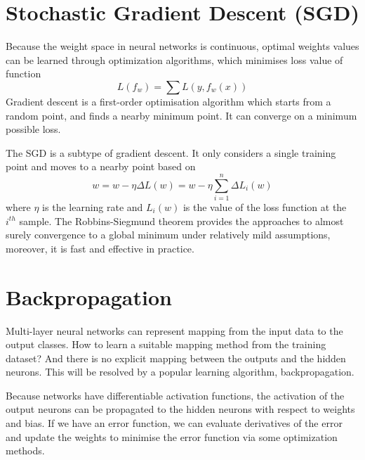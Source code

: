 \section{Stochastic Gradient Descent (SGD)}

Because the weight space in neural networks is continuous, optimal weights values can be learned through optimization algorithms, which minimises loss value of function
\begin{equation}\label{eq:LossMin}
L(f_{w}) = \sum L(y, f_{w}(x))
\end{equation}
Gradient descent is a first-order optimisation algorithm which starts from a random point, and finds a nearby minimum point. It can converge on a minimum possible loss.

The SGD is a subtype of gradient descent. It only considers a single training point and moves to a nearby point based on
\begin{equation}\label{eq:SGDUpdate}
w = w - \eta  \Delta L(w) = w - \eta \sum_{i=1}^{n} \Delta L_{i}(w)
\end{equation}
where $\eta$ is the learning rate and $L_{i}(w)$ is the value of the loss function at the $i^{th}$ sample. The Robbins-Siegmund theorem \citep{robbins1985convergence} provides the approaches to almost surely convergence to a global minimum under relatively mild assumptions, moreover, it is fast and effective in practice.

\section{Backpropagation}

Multi-layer neural networks can represent mapping from the input data to the output classes. How to learn a suitable mapping method from the training dataset? And there is no explicit mapping between the outputs and the hidden neurons. This will be resolved by a popular learning algorithm, backpropagation.

Because networks have differentiable activation functions, the activation of the output neurons can be propagated to the hidden neurons with respect to weights and bias. If we have an error function, we can evaluate derivatives of the error and update the weights to minimise the error function via some optimization methods.

